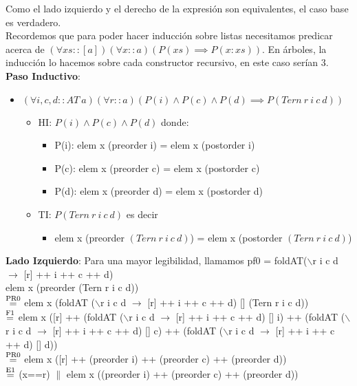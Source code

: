 \documentclass{article}
\begin{document}
Como el lado izquierdo y el derecho de la expresión son equivalentes, el caso base es verdadero. \\
Recordemos que para poder hacer inducción sobre listas necesitamos predicar acerca de $(\forall xs::[a])(\forall x ::a) (P(xs) \implies P(x:xs))$. En árboles, la inducción lo hacemos sobre cada constructor recursivo, en este caso serían 3. \\
\textbf{Paso Inductivo}: 
\begin{itemize}
    \item $(\forall i, c, d:: AT \ a)(\forall r::a)(P(i) \land P(c) \land P(d) \implies P(Tern \ r \ i \ c \ d))$
    \begin{itemize}
        \item HI: $P(i) \land P(c) \land P(d)$ donde: 
        \begin{itemize}
            \item P(i): elem x (preorder i) = elem x (postorder i)
            \item P(c): elem x (preorder c) = elem x (postorder c)
            \item P(d): elem x (preorder d) = elem x (postorder d)
        \end{itemize}
        \item TI: $P(Tern \ r \ i \ c \ d)$ es decir
        \begin{itemize}
        \item elem x (preorder $(Tern \ r \ i \ c \ d)$) = elem x (postorder $(Tern \ r \ i \ c \ d)$)
        \end{itemize}
    \end{itemize}
\end{itemize}
\textbf{Lado Izquierdo}: Para una mayor legibilidad, llamamos pf0 = foldAT($\backslash$r i c d $\rightarrow$ [r] ++ i ++ c ++ d) \\
elem x (preorder (Tern r i c d)) \\ 
$\stackrel{\text{PR0}}{=}$ elem x (foldAT ($\backslash$r i c d $\rightarrow$ [r] ++ i ++ c ++ d) [] (Tern r i c d)) \\ 
$\stackrel{\text{F1}}{=}$ elem x ([r] ++ (foldAT ($\backslash$r i c d $\rightarrow$ [r] ++ i ++ c ++ d) [] i) ++ (foldAT ($\backslash$r i c d $\rightarrow$ [r] ++ i ++ c ++ d) [] c) ++ (foldAT ($\backslash$r i c d $\rightarrow$ [r] ++ i ++ c ++ d) [] d)) \\ 
$\stackrel{\text{PR0}}{=}$ elem x ([r] ++ (preorder i) ++ (preorder c) ++ (preorder d)) \\
$\stackrel{\text{E1}}{=}$ (x==r) $\|$ elem x ((preorder i) ++ (preorder c) ++ (preorder d)) \\
\end{document}
